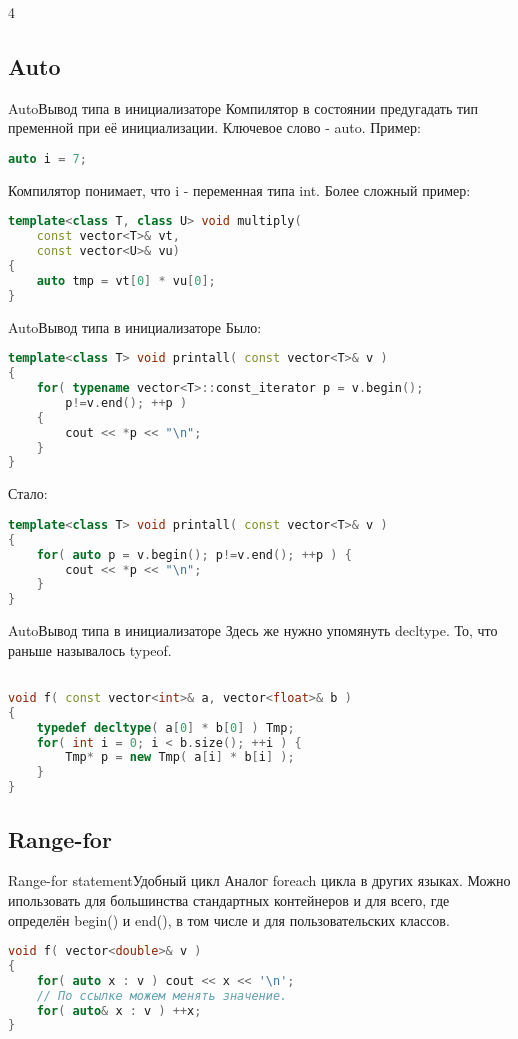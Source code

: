 4\documentclass[10pt]{beamer}
\begin{document}
\subsection{Auto}
\hypertarget{Auto}{}
\begin{frame}[fragile]{Auto}{Вывод типа в инициализаторе}
Компилятор в состоянии предугадать тип пременной при её инициализации. Ключевое слово - auto. Пример:
\begin{lstlisting}[language=C++]
auto i = 7;
\end{lstlisting}
Компилятор понимает, что i - переменная типа int. Более сложный пример:
\begin{lstlisting}[language=C++]
template<class T, class U> void multiply(
    const vector<T>& vt, 
    const vector<U>& vu)
{
    auto tmp = vt[0] * vu[0];
}
\end{lstlisting}
\end{frame}


\begin{frame}[fragile]{Auto}{Вывод типа в инициализаторе}
Было:
\begin{lstlisting}[language=C++]
template<class T> void printall( const vector<T>& v )
{
    for( typename vector<T>::const_iterator p = v.begin(); 
        p!=v.end(); ++p ) 
    {
        cout << *p << "\n";
    }
}
\end{lstlisting}
\vspace{5mm}
Стало:
\begin{lstlisting}[language=C++]
template<class T> void printall( const vector<T>& v )
{
    for( auto p = v.begin(); p!=v.end(); ++p ) {
        cout << *p << "\n";
    }
}
\end{lstlisting}
\end{frame}

\begin{frame}[fragile]{Auto}{Вывод типа в инициализаторе}
Здесь же нужно упомянуть decltype. То, что раньше называлось typeof.
\begin{lstlisting}[language=C++]

void f( const vector<int>& a, vector<float>& b )
{
    typedef decltype( a[0] * b[0] ) Tmp;
    for( int i = 0; i < b.size(); ++i ) {
        Tmp* p = new Tmp( a[i] * b[i] );
    }
}
\end{lstlisting}
\end{frame}

\subsection{Range-for}
\hypertarget{Range-for}{}
\begin{frame}[fragile]{Range-for statement}{Удобный цикл}
 Аналог foreach цикла в других языках. Можно ипользовать для большинства стандартных контейнеров и для всего, где определён begin() и end(), в том числе и для пользовательских классов.
\begin{lstlisting}[language=C++]
void f( vector<double>& v )
{
    for( auto x : v ) cout << x << '\n';
    // По ссылке можем менять значение.
    for( auto& x : v ) ++x;	
}
\end{lstlisting}
\end{frame}
\end{document}
